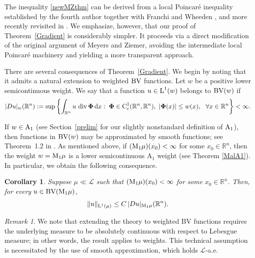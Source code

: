 \documentclass[11pt, a4paper, reqno]{amsart}
\newcommand{\R}{\mathbb R}
\newcommand{\A}{\textup A}
\newcommand{\dx}{\,{\mathrm dx}}
\newcommand{\Lup}{\textup{L}}
\newcommand{\BV}{\textup{BV}}
\newcommand{\Con}{\textup{C}}
\DeclareMathOperator{\Div}{\textup{div}}
\newtheorem{corollary}[theorem]{Corollary}
\theoremstyle{definition}
\theoremstyle{remark}
\newtheorem{remark}[theorem]{Remark}
\begin{document}
The inequality \eqref{newMZthm} can be derived from a local Poincar\'e inequality established by the {fourth author} together with Franchi and Wheeden \cite{FPW}, and more recently revisited in \cite{MPW}. We emphasize, however, that our proof of Theorem~\eqref{Gradient} is considerably simpler. It proceeds via a direct modification of the original argument of Meyers and Ziemer, avoiding the intermediate local Poincar\'e machinery and yielding a more transparent approach.

There are several consequences of Theorem~\ref{Gradient}.  
We begin by noting that it admits a natural extension to weighted $\BV$ functions.  Let $w$ be a positive lower semicontinuous weight. We say that a function 
$u \in \Lup^{1}(w)$ belongs to $\BV(w)$ if
\[
|Du|_{w}(\mathbb{R}^{n})
:= \sup \left\{
\int_{\mathbb{R}^{n}} u\, \Div \boldsymbol{\Phi}\dx
:\;
\boldsymbol{\Phi} \in \Con_c^{1}(\mathbb{R}^{n},\mathbb{R}^{n}),\ 
|\boldsymbol{\Phi}(x)| \le w(x), \ \ \forall x\in \R^n
\right\}
< \infty .
\]

If $w \in \A_{1}$ (see Section~\ref{prelim} for our slightly nonstandard definition of $\A_{1}$), then functions in $\BV(w)$ may be approximated by smooth functions; see Theorem~1.2 in \cite{BGKM}. As mentioned above, if $\textup (\textup{M}_{1}\mu)(x_{0})<\infty$ for some $x_{0}\in\mathbb{R}^{n}$, then the weight $w=\textup{M}_{1}\mu$ is a lower semicontinuous A$_1$ weight (see Theorem \ref{MalA1}). In particular, we obtain the following consequence.

\begin{corollary}\label{BVextens}
Suppose $\mu\ll \mathcal L$ such that
$(\textup{M}_{1}\mu)(x_{0})<\infty$ for some $x_{0}\in\mathbb{R}^{n}$. 
Then, for every $u \in \BV(\textup{M}_{1}\mu)$,
\begin{equation*}\label{BVextensineq}
\|u\|_{\Lup^{1}(\mu)} \le C\, |Du|_{\textup{M}_{1}\mu}(\mathbb{R}^{n}).
\end{equation*}
\end{corollary}
\begin{remark} We note that extending the theory to weighted BV functions requires the underlying measure to be absolutely continuous with respect to Lebesgue measure; in other words, the result applies to weights. This technical assumption is necessitated by the use of smooth approximation, which holds $\mathcal L$-a.e.

\end{remark}
\end{document}
